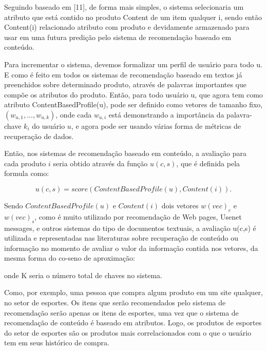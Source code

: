 \documentclass[12pt,
				openright,
				twoside,
				a4paper,
				apter=TITLE,
				section=TITLE,
				subsection=TITLE,
				chapter=TITLE,
				english,
				brazil]{abntex2}
\begin{document}
Seguindo baseado em [11], de forma mais simples, o sistema selecionaria um atributo que está contido no produto Content de um item qualquer i, sendo então Content(i) relacionado atributo com produto e devidamente armazenado para usar em uma futura predição pelo sistema de recomendação baseado em conteúdo.

Para incrementar o sistema, devemos formalizar um perfil de usuário para todo u. E como é feito em todos os sistemas de recomendação baseado em textos já preenchidos sobre determinado produto, através de palavras importantes que compõe os atributos do produto. Então, para todo usuário u, que agora tem como atributo ContentBasedProfile(u), pode ser definido
como vetores de tamanho fixo, $(w_{u,1}, ... , w_{u,k})$, onde cada $w_{u,i}$ está demonstrando a importância da palavra-chave $k_i$ do usuário $u$, e agora pode ser usando várias forma de métricas de recuperação de dados. 

Então, nos sistemas de recomendação baseado em conteúdo, a avaliação para cada produto $i$ seria obtido através da função $u(c,s)$, que é definida pela formula como: 

\begin{equation}
 u(c,s) = score(ContentBasedProfile(u),Content(i)).
\end{equation}


Sendo $ContentBasedProfile(u)$ e $Content(i)$ dois vetores $w(vec)_c$ e $w(vec)_s$, como é muito utilizado por recomendação de Web pages, Usenet messages, e outros sistemas do tipo de documentos textuais, a avaliação u(c,s) é utilizada e representadas nas literaturas sobre recuperação de conteúdo ou informação no momento de avaliar o valor da informação contida nos vetores, da mesma forma do co-seno de aproximação:


onde K seria o número total de chaves no sistema.

Como, por exemplo, uma pessoa que compra algum produto em um site qualquer, no setor de esportes. Os itens que serão recomendados pelo sistema de recomendação serão apenas os itens de esportes, uma vez que o sistema de recomendação de conteúdo é baseado em atributos. Logo, os produtos de esportes do setor de esportes são os produtos mais correlacionados com o que o usuário tem em seus histórico de compra. 
\end{document}
